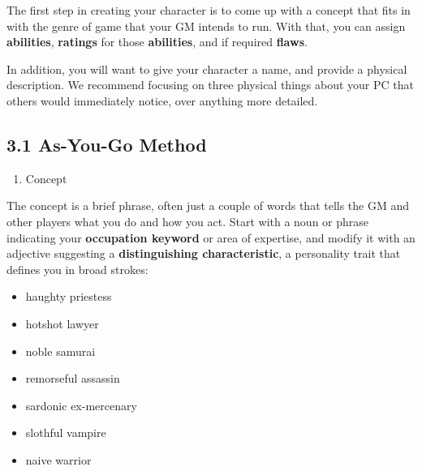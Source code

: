 \documentclass[
]{article}
\providecommand{\tightlist}{%
  \setlength{\itemsep}{0pt}\setlength{\parskip}{0pt}}
\begin{document}
The first step in creating your character is to come up with a concept
that fits in with the genre of game that your GM intends to run. With
that, you can assign \textbf{abilities}, \textbf{ratings} for those
\textbf{abilities}, and if required \textbf{flaws}.

In addition, you will want to give your character a name, and provide a
physical description. We recommend focusing on three physical things
about your PC that others would immediately notice, over anything more
detailed.

\hypertarget{as-you-go-method}{%
\subsection{3.1 As-You-Go Method}\label{as-you-go-method}}

\begin{enumerate}
\def\labelenumi{\arabic{enumi}.}
\tightlist
\item
  Concept
\end{enumerate}

The concept is a brief phrase, often just a couple of words that tells
the GM and other players what you do and how you act. Start with a noun
or phrase indicating your \textbf{occupation keyword} or area of
expertise, and modify it with an adjective suggesting a
\textbf{distinguishing characteristic}, a personality trait that defines
you in broad strokes:

\begin{itemize}
\tightlist
\item
  haughty priestess
\item
  hotshot lawyer
\item
  noble samurai
\item
  remorseful assassin
\item
  sardonic ex-mercenary
\item
  slothful vampire
\item
  naive warrior
\end{itemize}
\end{document}

